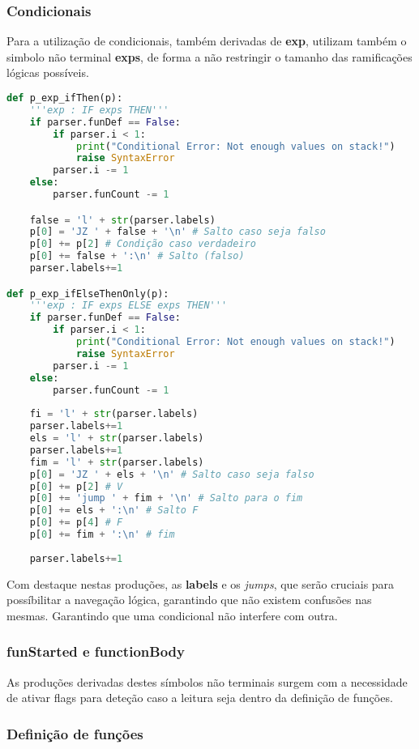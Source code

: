 \documentclass{predef}
\begin{document}
\subsubsection{Condicionais}
Para a utilização de condicionais, também derivadas de \textbf{exp}, utilizam também o simbolo não terminal \textbf{exps}, de forma a não restringir o tamanho das ramificações lógicas possíveis.
\begin{lstlisting}[language=Python]
    def p_exp_ifThen(p):
    '''exp : IF exps THEN'''
    if parser.funDef == False:
        if parser.i < 1:
            print("Conditional Error: Not enough values on stack!")
            raise SyntaxError
        parser.i -= 1
    else:
        parser.funCount -= 1

    false = 'l' + str(parser.labels)
    p[0] = 'JZ ' + false + '\n' # Salto caso seja falso
    p[0] += p[2] # Condição caso verdadeiro
    p[0] += false + ':\n' # Salto (falso)
    parser.labels+=1

def p_exp_ifElseThenOnly(p):
    '''exp : IF exps ELSE exps THEN'''
    if parser.funDef == False:
        if parser.i < 1:
            print("Conditional Error: Not enough values on stack!")
            raise SyntaxError
        parser.i -= 1
    else:
        parser.funCount -= 1
    
    fi = 'l' + str(parser.labels)
    parser.labels+=1
    els = 'l' + str(parser.labels)
    parser.labels+=1
    fim = 'l' + str(parser.labels)
    p[0] = 'JZ ' + els + '\n' # Salto caso seja falso
    p[0] += p[2] # V
    p[0] += 'jump ' + fim + '\n' # Salto para o fim
    p[0] += els + ':\n' # Salto F
    p[0] += p[4] # F
    p[0] += fim + ':\n' # fim
    
    parser.labels+=1
\end{lstlisting}
Com destaque nestas produções, as \textbf{labels} e os \textit{jumps}, que serão cruciais para possíbilitar a navegação lógica, garantindo que não existem confusões nas mesmas. Garantindo que uma condicional não interfere com outra.

\subsubsection{funStarted e functionBody}
As produções derivadas destes símbolos não terminais surgem com a necessidade de ativar flags para deteção caso a leitura seja dentro da definição de funções.

\subsubsection{Definição de funções}
\end{document}
